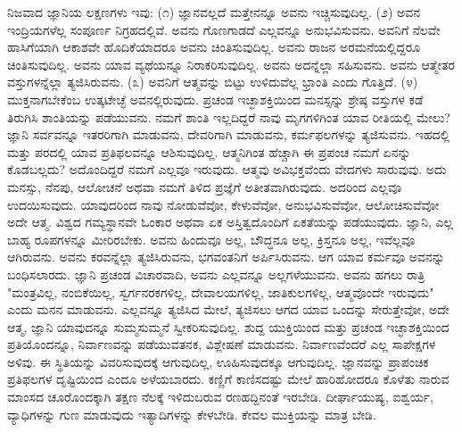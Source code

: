 ನಿಜವಾದ ಜ್ಞಾನಿಯ ಲಕ್ಷಣಗಳು ಇವು: (೧) ಜ್ಞಾನವಲ್ಲದೆ ಮತ್ತೇನನ್ನೂ ಅವನು ಇಚ್ಚಿಸುವುದಿಲ್ಲ. (೨) ಅವನ ಇಂದ್ರಿಯಗಳೆಲ್ಲ ಸಂಪೂರ್ಣ ನಿಗ್ರಹದಲ್ಲಿವೆ. ಅವನು ಗೊಣಗಾಡದೆ ಎಲ್ಲವನ್ನೂ ಅನುಭವಿಸುವನು. ಅವನಿಗೆ ನೆಲವೇ ಹಾಸಿಗೆಯಾಗಿ ಆಕಾಶವೇ ಹೊದಿಕೆಯಾದರೂ ಅವನು ಚಿಂತಿಸುವುದಿಲ್ಲ. ಅವನು ರಾಜನ ಅರಮನೆಯಲ್ಲಿದ್ದರೂ ಚಿಂತಿಸುವುದಿಲ್ಲ. ಅವನು ಯಾವ ವ್ಯಥೆಯನ್ನೂ ನಿರಾಕರಿಸುವುದಿಲ್ಲ. ಅವನು ಅದನ್ನೆಲ್ಲಾ ಸಹಿಸುವನು. ಅವನು ಆತ್ಮೇತರ ವಸ್ತುಗಳನ್ನೆಲ್ಲಾ ತ್ಯಜಿಸಿರುವನು. (೩) ಅವನಿಗೆ ಆತ್ಮವನ್ನು ಬಿಟ್ಟು ಉಳಿದುವೆಲ್ಲ ಭ್ರಾಂತಿ ಎಂದು ಗೊತ್ತಿದೆ. (೪) ಮುಕ್ತನಾಗಬೇಕೆಂಬ ಉತ್ಕಟೇಚ್ಛೆ ಅವನಲ್ಲಿರುವುದು. ಪ್ರಚಂಡ ಇಚ್ಛಾಶಕ್ತಿಯಿಂದ ಮನಸ್ಸನ್ನು ಶ್ರೇಷ್ಠ ವಸ್ತುಗಳ ಕಡೆ ತಿರುಗಿಸಿ ಶಾಂತಿಯನ್ನು ಪಡೆಯುವನು. ನಮಗೆ ಶಾಂತಿ ಇಲ್ಲದಿದ್ದರೆ ನಾವು ಮೃಗಗಳಿಗಿಂತ ಯಾವ ರೀತಿಯಲ್ಲಿ ಮೇಲು? ಜ್ಞಾನಿ ಸರ್ವವನ್ನೂ ಇತರರಿಗಾಗಿ ಮಾಡುವನು, ದೇವರಿಗಾಗಿ ಮಾಡುವನು, ಕರ್ಮಫಲಗಳನ್ನು ತ್ಯಜಿಸುವನು. ಇಹದಲ್ಲಿ ಮತ್ತು ಪರದಲ್ಲಿ ಯಾವ ಪ್ರತಿಫಲವನ್ನೂ ಆಶಿಸುವುದಿಲ್ಲ. ಆತ್ಮನಿಗಿಂತ ಹೆಚ್ಚಾಗಿ ಈ ಪ್ರಪಂಚ ನಮಗೆ ಏನನ್ನು ಕೊಡಬಲ್ಲದು? ಅದೊಂದಿದ್ದರೆ ನಮಗೆ ಎಲ್ಲವೂ ಇರುವುದು. ಆತ್ಮವು ಅವಿಭಕ್ತವೆಂದು ವೇದಗಳು ಸಾರುವುವು. ಅದು ಮನಸ್ಸು, ನೆನಪು, ಆಲೋಚನೆ ಅಥವಾ ನಮಗೆ ತಿಳಿದ ಪ್ರಜ್ಞೆಗೆ ಅತೀತವಾಗಿರುವುದು. ಅದರಿಂದ ಎಲ್ಲವೂ ಉದಯಿಸುವುದು. ಯಾವುದರಿಂದ ನಾವು ನೋಡುವೆವೋ, ಕೇಳುವೆವೋ, ಅನುಭವಿಸುವೆವೋ, ಆಲೋಚಿಸುವೆವೋ ಅದೇ ಆತ್ಮ. ವಿಶ್ವದ ಗಮ್ಯಸ್ಥಾನವೇ ಓಂಕಾರ ಅಥವಾ ಏಕ ಅಸ್ತಿತ್ವದೊಂದಿಗೆ ಏಕತೆಯನ್ನು ಪಡೆಯುವುದು. ಜ್ಞಾನಿ, ಎಲ್ಲ ಬಾಹ್ಯ ರೂಪಗಳನ್ನೂ ಮೀರಿರಬೇಕು. ಅವನು ಹಿಂದುವೂ ಅಲ್ಲ, ಬೌದ್ಧನೂ ಅಲ್ಲ, ಕ್ರಿಸ್ತನೂ ಅಲ್ಲ, ಇವೆಲ್ಲವೂ ಆಗಿರುವನು. ಅವನು ಕರವನ್ನೆಲ್ಲಾ ತ್ಯಜಿಸಿರುವನು, ಭಗವಂತನಿಗೆ ಅರ್ಪಿಸಿರುವನು. ಆಗ ಯಾವ ಕರ್ಮವೂ ಅವನನ್ನು ಬಂಧಿಸಲಾರದು. ಜ್ಞಾನಿ ಪ್ರಚಂಡ ವಿಚಾರವಾದಿ, ಅವನು ಎಲ್ಲವನ್ನೂ ಅಲ್ಲಗಳೆಯುವನು. ಅವನು ಹಗಲು ರಾತ್ರಿ "ಮಂತ್ರವಿಲ್ಲ, ನಂಬಿಕೆಯಿಲ್ಲ, ಸ್ವರ್ಗನರಕಗಳಿಲ್ಲ, ದೇವಾಲಯಗಳಿಲ್ಲ, ಜಾತಿಕುಲಗಳಿಲ್ಲ, ಆತ್ಮವೊಂದೇ ಇರುವುದು" ಎಂದು ಮನನ ಮಾಡುವನು. ಎಲ್ಲವನ್ನೂ ತ್ಯಜಿಸಿದ ಮೇಲೆ, ತ್ಯಜಿಸಲು ಆಗದ ಯಾವ ಒಂದನ್ನು ಸೇರುತ್ತೇವೋ, ಅದೇ ಆತ್ಮ, ಜ್ಞಾನಿ ಯಾವುದನ್ನೂ ಸುಮ್ಮಸುಮ್ಮನೆ ಸ್ವೀಕರಿಸುವುದಿಲ್ಲ. ಶುದ್ದ ಯುಕ್ತಿಯಿಂದ ಮತ್ತು ಪ್ರಚಂಡ ಇಚ್ಛಾಶಕ್ತಿಯಿಂದ ಪ್ರತಿಯೊಂದನ್ನೂ, ನಿರ್ವಾಣವನ್ನು ಪಡೆಯುವತನಕ, ವಿಶ್ಲೇಷಣೆ ಮಾಡುವನು. ನಿರ್ವಾಣವೆಂದರೆ ಎಲ್ಲ ಸಾಪೇಕ್ಷಗಳ ಅಳಿವು. ಈ ಸ್ಥಿತಿಯನ್ನು ವಿವರಿಸುವುದಕ್ಕೆ ಆಗುವುದಿಲ್ಲ, ಊಹಿಸುವುದಕ್ಕೂ ಆಗುವುದಿಲ್ಲ. ಜ್ಞಾನವನ್ನು ಪ್ರಾಪಂಚಿಕ ಪ್ರತಿಫಲಗಳ ದೃಷ್ಟಿಯಿಂದ ಎಂದೂ ಅಳೆಯಬಾರದು. ಕಣ್ಣಿಗೆ ಕಾಣಿಸದಷ್ಟು ಮೇಲೆ ಹಾರಿಹೋದರೂ ಕೊಳೆತು ನಾರುವ ಮಾಂಸದ ಚೂರೊಂದಕ್ಕಾಗಿ ತಕ್ಷಣ ನೆಲಕ್ಕೆ ಇಳಿದುಬರುವ ರಣಹದ್ದಿನಂತೆ ಇರಬೇಡಿ. ದೀರ್ಘಾಯುಷ್ಯ, ಐಶ್ವರ್ಯ, ವ್ಯಾಧಿಗಳನ್ನು ಗುಣ ಮಾಡುವುದು ಇತ್ಯಾದಿಗಳನ್ನು ಕೇಳಬೇಡಿ. ಕೇವಲ ಮುಕ್ತಿಯನ್ನು ಮಾತ್ರ ಬೇಡಿ.


